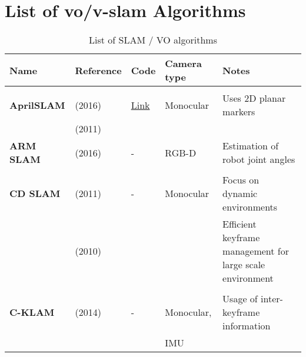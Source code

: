 \section{List of \acrshort{vo}/\acrshort{v-slam} Algorithms}
\label{section:A.1}
	{\footnotesize
		\begin{longtable}{l|l|l|l|l}
			\caption{List of SLAM / VO algorithms \cite{chris}}\\[2mm]
			\textbf{Name}            & \textbf{Reference}                     & \textbf{Code}                                                      & \textbf{Camera type}  & \textbf{Notes}\\
			\hline
			&                                   &                                                                    &                       &\\
			\textbf{AprilSLAM}     & \cite{Wang2016} (2016)            & \href{https://github.com/ProjectArtemis/aprilslam}{Link}           & Monocular             & Uses 2D planar markers\\
			& \cite{Olson2011} (2011)           &                                                                    &                       &\\
			\textbf{ARM SLAM}      & \cite{Klingensmith2016} (2016)    & -                                                                  & RGB-D                 & Estimation of robot joint angles\\
			&                                   &                                                                    &                       &\\
			\textbf{CD SLAM}       & \cite{Pirker2011} (2011)          & -                                                                  & Monocular             & Focus on dynamic environments\\
			& \cite{Pirker2010} (2010)          &                                                                    &                       & Efficient keyframe management for large scale environment\\
			&                                   &                                                                    &                       &\\
			\textbf{C-KLAM}        & \cite{Nerurkar2014} (2014)        & -                                                                  & Monocular,            & Usage of inter-keyframe information\\
			&                                   &                                                                    & IMU                   &\\

\end{longtable}}

